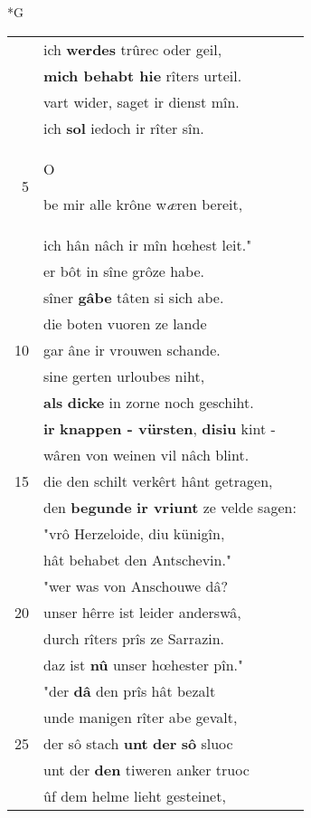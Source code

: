 \documentclass[8pt,a4paper,notitlepage]{article}
\begin{document}
\newpage
\begin{table}[ht]
\begin{minipage}[t]{0.5\linewidth}
\small
\begin{center}*G
\end{center}
\begin{tabular}{rl}
 & ich \textbf{werdes} trûrec oder geil,\\ 
 & \textbf{mich behabt hie} rîters urteil.\\ 
 & vart wider, saget ir dienst mîn.\\ 
 & ich \textbf{sol} iedoch ir rîter sîn.\\ 
5 & \begin{large}O\end{large}be mir alle krône w\textit{æ}ren bereit,\\ 
 & ich hân nâch ir mîn hœhest leit."\\ 
 & er bôt in sîne grôze habe.\\ 
 & sîner \textbf{gâbe} tâten si sich abe.\\ 
 & die boten vuoren ze lande\\ 
10 & gar âne ir vrouwen schande.\\ 
 & sine gerten urloubes niht,\\ 
 & \textbf{als} \textbf{dicke} in zorne noch geschiht.\\ 
 & \textbf{ir} \textbf{knappen - vürsten}, \textbf{disiu} kint -\\ 
 & wâren von weinen vil nâch blint.\\ 
15 & die den schilt verkêrt hânt getragen,\\ 
 & den \textbf{begunde} \textbf{ir vriunt} ze velde sagen:\\ 
 & "vrô Herzeloide, diu künigîn,\\ 
 & hât behabet den Antschevin."\\ 
 & "wer was von Anschouwe dâ?\\ 
20 & unser hêrre ist leider anderswâ,\\ 
 & durch rîters prîs ze Sarrazin.\\ 
 & daz ist \textbf{nû} unser hœhester pîn."\\ 
 & "der \textbf{dâ} den prîs hât bezalt\\ 
 & unde manigen rîter abe gevalt,\\ 
25 & der sô stach \textbf{unt} \textbf{der} \textbf{sô} sluoc\\ 
 & unt der \textbf{den} tiweren anker truoc\\ 
 & ûf dem helme lieht gesteinet,\\ 

\end{tabular}
\end{minipage}
\end{table}
\end{document}
